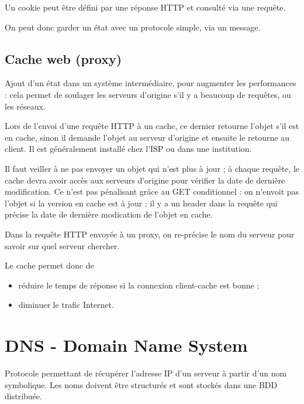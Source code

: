 	Un cookie peut être défini par une réponse HTTP et consulté via une requête.
	
	
	On peut donc garder un état avec un protocole simple, via un message.
	
	\subsection{Cache web (proxy)}
		
	Ajout d'un état dans un système intermédiaire, pour augmenter les performances : cela permet de soulager les serveurs d'origine s'il y a beaucoup de requêtes, ou les réseaux.
	
	Lors de l'envoi d'une requête HTTP à un cache, ce dernier retourne l'objet s'il est en cache, sinon il demande l'objet au serveur d'origine et ensuite le retourne au client. Il est généralement installé chez l'ISP ou dans une institution.
	
	
	Il faut veiller à ne pas envoyer un objet qui n'est plus à jour ; à chaque requête, le cache devra avoir accès aux serveurs d'origine pour vérifier la date de dernière modification. Ce n'est pas pénalisant grâce au GET conditionnel : on n'envoit pas l'objet si la version en cache est à jour ; il y a un header dans la requête qui précise la date de dernière modication de l'objet en cache.


	
	Dans la requête HTTP envoyée à un proxy, on re-précise le nom du serveur pour savoir sur quel serveur chercher. 
	
	Le cache permet donc de 
	
	\begin{itemize}
		\item réduire le temps de réponse si la connexion client-cache est bonne ;
		\item diminuer le trafic Internet.
	\end{itemize}
	

\section{DNS - Domain Name System}

Protocole permettant de récupérer l'adresse IP d'un serveur à partir d'un nom symbolique. Les noms doivent être structurés et sont stockés dans une BDD distribuée.

